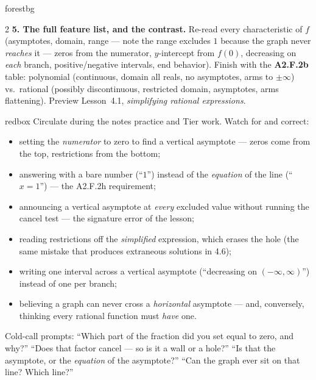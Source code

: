 \documentclass[10pt]{article}
\begin{document}
\begin{skillbox}[Lesson]{forestbg}
\begin{multicols}{2}
\textbf{5. The full feature list, and the contrast.} Re-read every characteristic of $f$ (asymptotes,
domain, range --- note the range excludes $1$ because the graph never \emph{reaches} it --- zeros from
the numerator, $y$-intercept from $f(0)$, decreasing on \emph{each} branch, positive/negative
intervals, end behavior). Finish with the \textbf{A2.F.2b} table: polynomial (continuous, domain all
reals, no asymptotes, arms to $\pm\infty$) vs.\ rational (possibly discontinuous, restricted domain,
asymptotes, arms flattening). Preview Lesson~4.1, \emph{simplifying rational expressions}.
\end{multicols}
\end{skillbox}

\begin{skillbox}{redbox}
Circulate during the notes practice and Tier work. Watch for and correct:
\begin{itemize}[leftmargin=1.2em, nosep]
  \item setting the \emph{numerator} to zero to find a vertical asymptote --- zeros come from the top, restrictions from the bottom;
  \item answering with a bare number (``$1$'') instead of the \emph{equation} of the line (``$x=1$'') --- the A2.F.2h requirement;
  \item announcing a vertical asymptote at \emph{every} excluded value without running the cancel test --- the signature error of the lesson;
  \item reading restrictions off the \emph{simplified} expression, which erases the hole (the same mistake that produces extraneous solutions in 4.6);
  \item writing one interval across a vertical asymptote (``decreasing on $(-\infty,\infty)$'') instead of one per branch;
  \item believing a graph can never cross a \emph{horizontal} asymptote --- and, conversely, thinking every rational function must \emph{have} one.
\end{itemize}
Cold-call prompts: ``Which part of the fraction did you set equal to zero, and why?'' ``Does that
factor cancel --- so is it a wall or a hole?'' ``Is that the asymptote, or the \emph{equation} of the
asymptote?'' ``Can the graph ever sit on that line? Which line?''
\end{skillbox}
\end{document}
